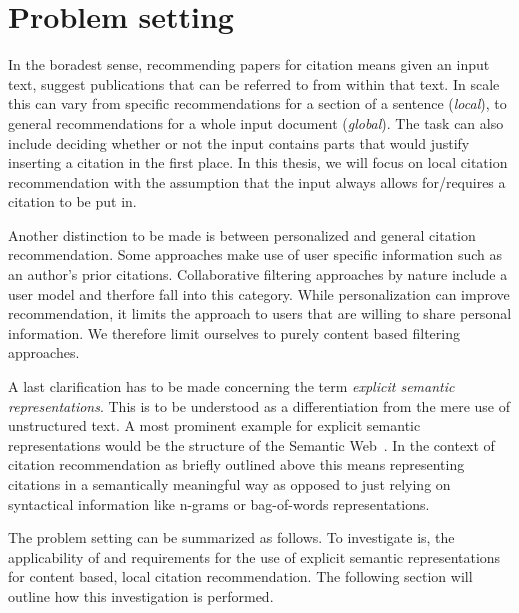 
\section{Problem setting}\label{sec:problemsetting}
In the boradest sense, recommending papers for citation means given an input text, suggest publications that can be referred to from within that text. In scale this can vary from specific recommendations for a section of a sentence (\emph{local}), to general recommendations for a whole input document (\emph{global}). The task can also include deciding whether or not the input contains parts that would justify inserting a citation in the first place. In this thesis, we will focus on local citation recommendation with the assumption that the input always allows for/requires a citation to be put in.

Another distinction to be made is between personalized and general citation recommendation. Some approaches make use of user specific information such as an author's prior citations. Collaborative filtering approaches by nature include a user model and therfore fall into this category. While personalization can improve recommendation, it limits the approach to users that are willing to share personal information. %
We therefore limit ourselves to purely content based filtering approaches.

A last clarification has to be made concerning the term \emph{explicit semantic representations}. This is to be understood as a differentiation from the mere use of unstructured text. A most prominent example for explicit semantic representations would be the structure of the Semantic Web~\cite{Berners-Lee2001}. In the context of citation recommendation as briefly outlined above this means representing citations in a semantically meaningful way as opposed to just relying on syntactical information like n-grams or bag-of-words representations.

The problem setting can be summarized as follows. To investigate is, the applicability of and requirements for the use of explicit semantic representations for content based, local citation recommendation. The following section will outline how this investigation is performed.

